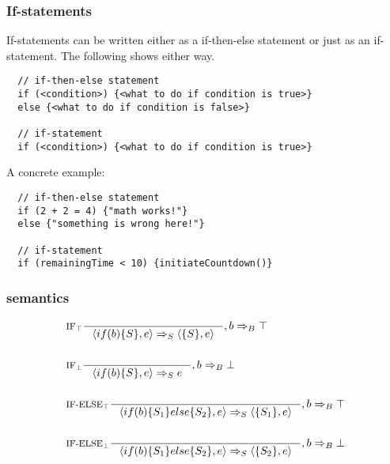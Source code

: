 \subsubsection{If-statements}
\label{subsec:ifStatements}
\newcommand{\Tif}{\text{if}}
\newcommand{\Telse}{\text{else}}

If-statements can be written either as a if-then-else statement or just as an if-statement. The following shows either way.

\begin{verbatim}
  // if-then-else statement
  if (<condition>) {<what to do if condition is true>}
  else {<what to do if condition is false>}

  // if-statement
  if (<condition>) {<what to do if condition is true>}
\end{verbatim}

A concrete example:

\begin{verbatim}
  // if-then-else statement
  if (2 + 2 = 4) {"math works!"}
  else {"something is wrong here!"}

  // if-statement
  if (remainingTime < 10) {initiateCountdown()}
\end{verbatim}

\subsubsection{semantics}

\begin{align*}
&\inference[$\text{IF}_\top$]{}
                      {\Braket{if(b)\{S\},e} \Rightarrow_S \Braket{\{S\},e}}
                      {,b \Rightarrow_B \top}
\\\\
&\inference[$\text{IF}_\bot$]{}
                      {\Braket{if(b)\{S\},e} \Rightarrow_S e}
                      {,b \Rightarrow_B \bot}
\\\\
&\inference[$\text{IF-ELSE}_\top$]{}
                      {\Braket{if(b)\{S_1\}else\{S_2\},e} \Rightarrow_S \Braket{\{S_1\},e}}
                      {,b \Rightarrow_B \top}
\\\\
&\inference[$\text{IF-ELSE}_\bot$]{}
                      {\Braket{if(b)\{S_1\}else\{S_2\},e} \Rightarrow_S \Braket{\{S_2\},e}}
                      {,b \Rightarrow_B \bot}
\end{align*}